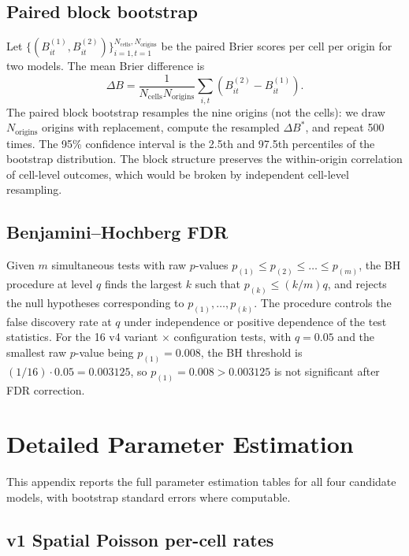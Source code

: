 \documentclass[10pt,a4paper,twocolumn]{article}
\begin{document}
\subsection{Paired block bootstrap}\label{app:bootstrap}

Let $\{(B_{it}^{(1)}, B_{it}^{(2)})\}_{i=1, t=1}^{N_{\text{cells}}, N_{\text{origins}}}$ be the paired Brier scores per cell per origin for two models. The mean Brier difference is
\[
\Delta B = \frac{1}{N_{\text{cells}} N_{\text{origins}}} \sum_{i, t} (B_{it}^{(2)} - B_{it}^{(1)}).
\]
The paired block bootstrap resamples the nine origins (not the cells): we draw $N_{\text{origins}}$ origins with replacement, compute the resampled $\Delta B^*$, and repeat 500 times. The 95\% confidence interval is the 2.5th and 97.5th percentiles of the bootstrap distribution. The block structure preserves the within-origin correlation of cell-level outcomes, which would be broken by independent cell-level resampling.

\subsection{Benjamini--Hochberg FDR}\label{app:bh}

Given $m$ simultaneous tests with raw $p$-values $p_{(1)} \leq p_{(2)} \leq \dots \leq p_{(m)}$, the BH procedure at level $q$ finds the largest $k$ such that $p_{(k)} \leq (k/m) q$, and rejects the null hypotheses corresponding to $p_{(1)}, \dots, p_{(k)}$. The procedure controls the false discovery rate at $q$ under independence or positive dependence of the test statistics. For the 16 v4 variant $\times$ configuration tests, with $q=0.05$ and the smallest raw $p$-value being $p_{(1)} = 0.008$, the BH threshold is $(1/16)\cdot 0.05 = 0.003125$, so $p_{(1)} = 0.008 > 0.003125$ is not significant after FDR correction.

\section{Detailed Parameter Estimation}\label{app:parameters}

This appendix reports the full parameter estimation tables for all four candidate models, with bootstrap standard errors where computable.

\subsection{v1 Spatial Poisson per-cell rates}
\end{document}

